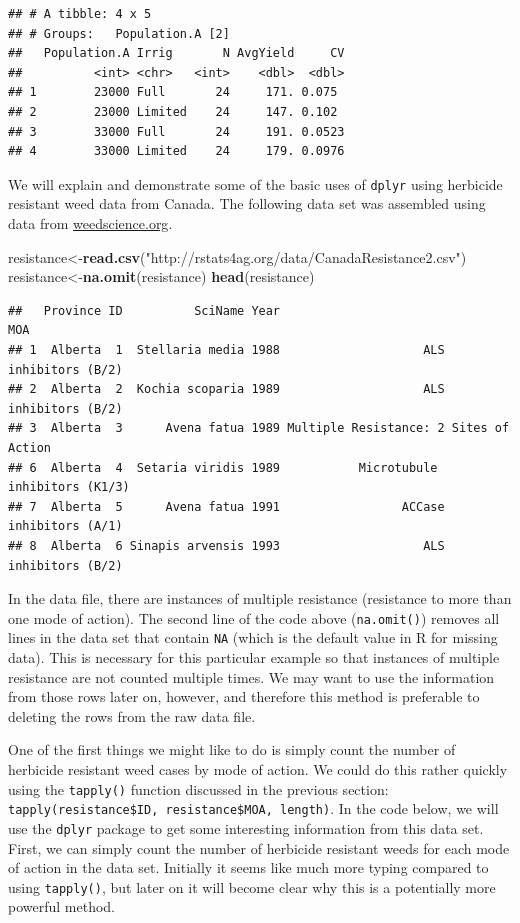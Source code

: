 \documentclass[letterpaper,]{book}
\newenvironment{Shaded}{\begin{snugshade}}{\end{snugshade}}
\newcommand{\KeywordTok}[1]{\textcolor[rgb]{0.13,0.29,0.53}{\textbf{#1}}}
\newcommand{\NormalTok}[1]{#1}
\newcommand{\StringTok}[1]{\textcolor[rgb]{0.31,0.60,0.02}{#1}}
\begin{document}
\begin{verbatim}
## # A tibble: 4 x 5
## # Groups:   Population.A [2]
##   Population.A Irrig       N AvgYield     CV
##          <int> <chr>   <int>    <dbl>  <dbl>
## 1        23000 Full       24     171. 0.075 
## 2        23000 Limited    24     147. 0.102 
## 3        33000 Full       24     191. 0.0523
## 4        33000 Limited    24     179. 0.0976
\end{verbatim}

We will explain and demonstrate some of the basic uses of \texttt{dplyr} using herbicide resistant weed data from Canada. The following data set was assembled using data from \href{http://www.weedscience.org}{weedscience.org}.

\begin{Shaded}
\begin{Highlighting}[]
\NormalTok{resistance<-}\KeywordTok{read.csv}\NormalTok{(}\StringTok{"http://rstats4ag.org/data/CanadaResistance2.csv"}\NormalTok{)}
\NormalTok{resistance<-}\KeywordTok{na.omit}\NormalTok{(resistance)}
\KeywordTok{head}\NormalTok{(resistance)}
\end{Highlighting}
\end{Shaded}

\begin{verbatim}
##   Province ID          SciName Year                                     MOA
## 1  Alberta  1  Stellaria media 1988                    ALS inhibitors (B/2)
## 2  Alberta  2  Kochia scoparia 1989                    ALS inhibitors (B/2)
## 3  Alberta  3      Avena fatua 1989 Multiple Resistance: 2 Sites of Action 
## 6  Alberta  4  Setaria viridis 1989           Microtubule inhibitors (K1/3)
## 7  Alberta  5      Avena fatua 1991                 ACCase inhibitors (A/1)
## 8  Alberta  6 Sinapis arvensis 1993                    ALS inhibitors (B/2)
\end{verbatim}

In the data file, there are instances of multiple resistance (resistance to more than one mode of action).
The second line of the code above (\texttt{na.omit()}) removes all lines in the data set that contain \texttt{NA} (which is the default value in R for missing data). This is necessary for this particular example so that instances of multiple resistance are not counted multiple times. We may want to use the information from those rows later on, however, and therefore this method is preferable to deleting the rows from the raw data file.

One of the first things we might like to do is simply count the number of herbicide resistant weed cases by mode of action. We could do this rather quickly using the \texttt{tapply()} function discussed in the previous section: \texttt{tapply(resistance\$ID,\ resistance\$MOA,\ length)}. In the code below, we will use the \texttt{dplyr} package to get some interesting information from this data set. First, we can simply count the number of herbicide resistant weeds for each mode of action in the data set. Initially it seems like much more typing compared to using \texttt{tapply()}, but later on it will become clear why this is a potentially more powerful method.
\end{document}
